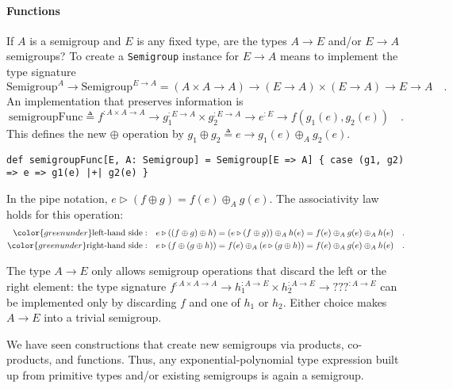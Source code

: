 \paragraph{Functions}

If $A$ is a semigroup and $E$ is any fixed type, are the types $A\rightarrow E$
and/or $E\rightarrow A$ semigroups? To create a \lstinline!Semigroup!
instance for $E\rightarrow A$ means to implement the type signature
\[
\text{Semigroup}^{A}\rightarrow\text{Semigroup}^{E\rightarrow A}=\left(A\times A\rightarrow A\right)\rightarrow\left(E\rightarrow A\right)\times\left(E\rightarrow A\right)\rightarrow E\rightarrow A\quad.
\]
An implementation that preserves information is
\[
\text{semigroupFunc}\triangleq f^{:A\times A\rightarrow A}\rightarrow g_{1}^{:E\rightarrow A}\times g_{2}^{:E\rightarrow A}\rightarrow e^{:E}\rightarrow f(g_{1}(e),g_{2}(e))\quad.
\]
This defines the new $\oplus$ operation by $g_{1}\oplus g_{2}\triangleq e\rightarrow g_{1}(e)\oplus_{A}g_{2}(e)$.
\begin{lstlisting}
def semigroupFunc[E, A: Semigroup] = Semigroup[E => A] { case (g1, g2) => e => g1(e) |+| g2(e) }
\end{lstlisting}

In the pipe notation, $e\triangleright(f\oplus g)=f(e)\oplus_{A}g(e)$.
The associativity law holds for this operation:
\begin{align*}
{\color{greenunder}\text{left-hand side}:}\quad & e\triangleright\left(\left(f\oplus g\right)\oplus h\right)=\left(e\triangleright(f\oplus g)\right)\oplus_{A}h(e)=f(e)\oplus_{A}g(e)\oplus_{A}h(e)\quad.\\
{\color{greenunder}\text{right-hand side}:}\quad & e\triangleright\left(f\oplus\left(g\oplus h\right)\right)=f(e)\oplus_{A}\left(e\triangleright(g\oplus h)\right)=f(e)\oplus_{A}g(e)\oplus_{A}h(e)\quad.
\end{align*}

The type $A\rightarrow E$ only allows semigroup operations that discard
the left or the right element: the type signature $f^{:A\times A\rightarrow A}\rightarrow h_{1}^{:A\rightarrow E}\times h_{2}^{:A\rightarrow E}\rightarrow\text{???}^{:A\rightarrow E}$
can be implemented only by discarding $f$ and one of $h_{1}$ or
$h_{2}$. Either choice makes $A\rightarrow E$ into a trivial semigroup.

We have seen constructions that create new semigroups via products,
co-products, and functions. Thus, any exponential-polynomial type
expression built up from primitive types and/or existing semigroups
is again a semigroup.

